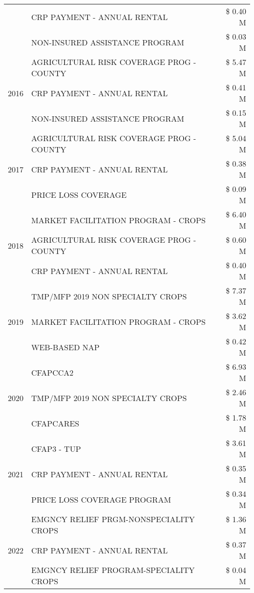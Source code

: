 \begin{tabular}{llr}
 & CRP PAYMENT - ANNUAL RENTAL & \$ 0.40 M \\
 & NON-INSURED ASSISTANCE PROGRAM & \$ 0.03 M \\
\cline{1-3}
\multirow[t]{3}{*}{2016} & AGRICULTURAL RISK COVERAGE PROG - COUNTY & \$ 5.47 M \\
 & CRP PAYMENT - ANNUAL RENTAL & \$ 0.41 M \\
 & NON-INSURED ASSISTANCE PROGRAM & \$ 0.15 M \\
\cline{1-3}
\multirow[t]{3}{*}{2017} & AGRICULTURAL RISK COVERAGE PROG - COUNTY & \$ 5.04 M \\
 & CRP PAYMENT - ANNUAL RENTAL & \$ 0.38 M \\
 & PRICE LOSS COVERAGE & \$ 0.09 M \\
\cline{1-3}
\multirow[t]{3}{*}{2018} & MARKET FACILITATION PROGRAM - CROPS & \$ 6.40 M \\
 & AGRICULTURAL RISK COVERAGE PROG - COUNTY & \$ 0.60 M \\
 & CRP PAYMENT - ANNUAL RENTAL & \$ 0.40 M \\
\cline{1-3}
\multirow[t]{3}{*}{2019} & TMP/MFP 2019 NON SPECIALTY CROPS & \$ 7.37 M \\
 & MARKET FACILITATION PROGRAM - CROPS & \$ 3.62 M \\
 & WEB-BASED NAP & \$ 0.42 M \\
\cline{1-3}
\multirow[t]{3}{*}{2020} & CFAPCCA2 & \$ 6.93 M \\
 & TMP/MFP 2019 NON SPECIALTY CROPS & \$ 2.46 M \\
 & CFAPCARES & \$ 1.78 M \\
\cline{1-3}
\multirow[t]{3}{*}{2021} & CFAP3 - TUP & \$ 3.61 M \\
 & CRP PAYMENT - ANNUAL RENTAL & \$ 0.35 M \\
 & PRICE LOSS COVERAGE PROGRAM & \$ 0.34 M \\
\cline{1-3}
\multirow[t]{3}{*}{2022} & EMGNCY RELIEF PRGM-NONSPECIALITY CROPS & \$ 1.36 M \\
 & CRP PAYMENT - ANNUAL RENTAL & \$ 0.37 M \\
 & EMGNCY RELIEF PROGRAM-SPECIALITY CROPS & \$ 0.04 M \\
\cline{1-3}
\bottomrule
\end{tabular}
